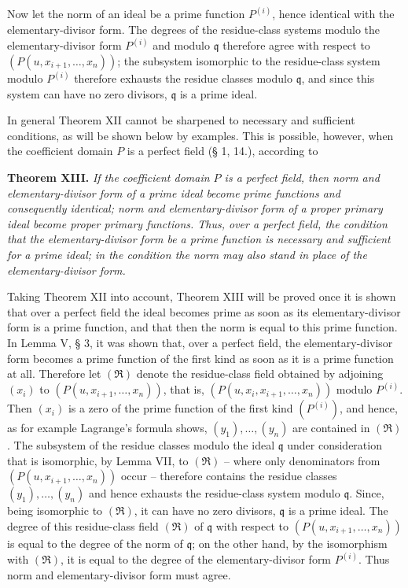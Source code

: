 \documentclass[11pt]{article}
\providecommand{\mR}{\mathfrak{R}}
\providecommand{\frakq}{\mathfrak q}
\providecommand{\mR}{\mathfrak{R}}
\providecommand{\frakq}{\mathfrak q}
\begin{document}
Now let the norm of an ideal be a prime function $P^{(i)}$, hence identical with the elementary-divisor form. The degrees of the residue-class systems modulo the elementary-divisor form $P^{(i)}$ and modulo $\frakq$ therefore agree with respect to $(P(u,x_{i+1},\ldots,x_n))$; the subsystem isomorphic to the residue-class system modulo $P^{(i)}$ therefore exhausts the residue classes modulo $\frakq$, and since this system can have no zero divisors, $\frakq$ is a prime ideal.

In general Theorem XII cannot be sharpened to necessary and sufficient conditions, as will be shown below by examples. This is possible, however, when the coefficient domain $P$ is a perfect field (§ 1, 14.), according to

\textbf{Theorem XIII.} \emph{If the coefficient domain $P$ is a perfect field, then norm and elementary-divisor form of a prime ideal become prime functions and consequently identical; norm and elementary-divisor form of a proper primary ideal become proper primary functions. Thus, over a perfect field, the condition that the elementary-divisor form be a prime function is necessary and sufficient for a prime ideal; in the condition the norm may also stand in place of the elementary-divisor form.}

Taking Theorem XII into account, Theorem XIII will be proved once it is shown that over a perfect field the ideal becomes prime as soon as its elementary-divisor form is a prime function, and that then the norm is equal to this prime function. In Lemma V, § 3, it was shown that, over a perfect field, the elementary-divisor form becomes a prime function of the first kind as soon as it is a prime function at all. Therefore let $(\mR)$ denote the residue-class field obtained by adjoining $(x_i)$ to $(P(u,x_{i+1},\ldots,x_n))$, that is, $(P(u,x_i,x_{i+1},\ldots,x_n))$ modulo $P^{(i)}$. Then $(x_i)$ is a zero of the prime function of the first kind $(P^{(i)})$, and hence, as for example Lagrange's formula shows, $(y_1),\ldots,(y_n)$ are contained in $(\mR)$. The subsystem of the residue classes modulo the ideal $\frakq$ under consideration that is isomorphic, by Lemma VII, to $(\mR)$ -- where only denominators from $(P(u,x_{i+1},\ldots,x_n))$ occur -- therefore contains the residue classes $(y_1),\ldots,(y_n)$ and hence exhausts the residue-class system modulo $\frakq$. Since, being isomorphic to $(\mR)$, it can have no zero divisors, $\frakq$ is a prime ideal. The degree of this residue-class field $(\mR)$ of $\frakq$ with respect to $(P(u,x_{i+1},\ldots,x_n))$ is equal to the degree of the norm of $\frakq$; on the other hand, by the isomorphism with $(\mR)$, it is equal to the degree of the elementary-divisor form $P^{(i)}$. Thus norm and elementary-divisor form must agree.
\end{document}
